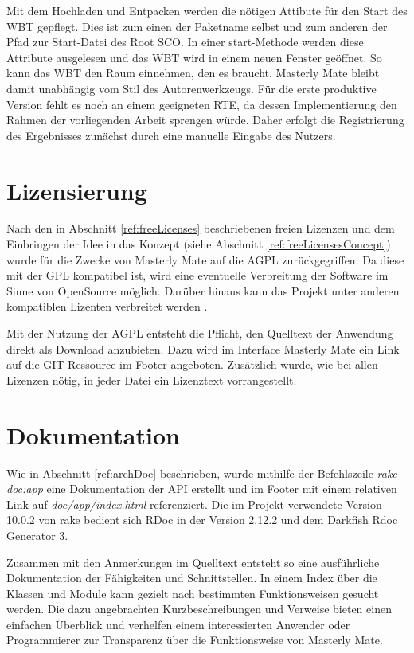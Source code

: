 Mit dem Hochladen und Entpacken werden die nötigen Attibute für den Start des
WBT gepflegt. Dies ist zum einen der Paketname selbst und zum anderen der Pfad
zur Start-Datei des Root SCO. In einer start-Methode werden diese Attribute
ausgelesen und das WBT wird in einem neuen Fenster geöffnet. So kann das WBT den
Raum einnehmen, den es braucht. Masterly Mate bleibt damit unabhängig vom Stil
des Autorenwerkzeugs. Für die erste produktive Version fehlt es noch an einem
geeigneten RTE, da dessen Implementierung den Rahmen der vorliegenden Arbeit
sprengen würde. Daher erfolgt die Registrierung des Ergebnisses zunächst durch
eine manuelle Eingabe des Nutzers.

\section{Lizensierung}
Nach den in Abschnitt \ref{ref:freeLicenses} beschriebenen freien Lizenzen und
dem Einbringen der Idee in das Konzept (siehe Abschnitt
\ref{ref:freeLicensesConcept}) wurde für die Zwecke von Masterly Mate auf die
\ac{AGPL} zurückgegriffen. Da diese mit der \ac{GPL} kompatibel ist, wird
eine eventuelle Verbreitung der Software im Sinne von OpenSource möglich.
Darüber hinaus kann das Projekt unter anderen kompatiblen Lizenten verbreitet
werden \cite{fsf:2007}.

Mit der Nutzung der AGPL entsteht die Pflicht, den Quelltext der Anwendung
direkt als Download anzubieten. Dazu wird im Interface Masterly Mate
ein Link auf die GIT-Ressource im Footer angeboten. Zusätzlich wurde, wie bei
allen Lizenzen nötig, in jeder Datei ein Lizenztext vorrangestellt.

\section{Dokumentation}
Wie in Abschnitt \ref{ref:archDoc} beschrieben, wurde mithilfe der Befehlszeile
\textit{rake doc:app} eine Dokumentation der API erstellt und im Footer
mit einem relativen Link auf \textit{doc/app/index.html} referenziert. Die im
Projekt verwendete Version 10.0.2 von rake bedient sich RDoc in der Version
2.12.2 und dem Darkfish Rdoc Generator 3.

Zusammen mit den Anmerkungen im Quelltext entsteht so eine ausführliche
Dokumentation der Fähigkeiten und Schnittstellen. In einem Index über die
Klassen und Module kann gezielt nach bestimmten Funktionsweisen gesucht werden.
Die dazu angebrachten Kurzbeschreibungen und Verweise bieten einen einfachen
Überblick und verhelfen einem interessierten Anwender oder Programmierer zur
Transparenz über die Funktionsweise von Masterly Mate.

